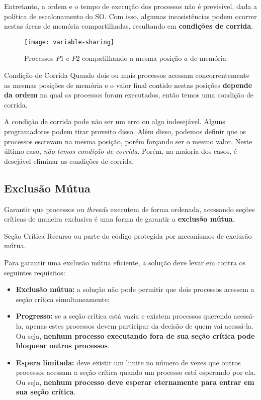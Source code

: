 Entretanto, a ordem e o tempo de execução dos processos não é previsível, dada a política de escalonamento do SO. Com isso, algumas incosistências podem ocorrer nestas áreas de memória compartilhadas, resultando em \textbf{condições de corrida}.

\begin{figure}
  \texttt{[image: variable-sharing]}
  \caption{Processos $P1$ e $P2$ compatilhando a mesma posição $a$ de memória}
  \label{fig:variable-sharing}
\end{figure}

\begin{definicao}{Condição de Corrida}
  Quando dois ou mais processos acessam concorrentemente as mesmas posições de memória e o valor final contido nestas posições \textbf{depende da ordem} na qual os processos foram executados, então temos uma condição de corrida.
\end{definicao}

A condição de corrida pode não ser um erro ou algo indesejável. Alguns programadores podem tirar proveito disso. Além disso, podemos definir que os processos escrevam na mesma posição, porém forçando ser o mesmo valor. Neste último caso, \textit{não temos condição de corrida}. Porém, na maioria dos casos, é desejável eliminar as condições de corrida.





\subsection{Exclusão Mútua}
Garantir que processos ou \textit{threads} executem de forma ordenada, acessando seções críticas de maneira exclusiva é uma forma de garantir a \textbf{exclusão mútua}.

\begin{definicao}{Seção Crítica}
  Recurso ou parte do código protegida por mecanismos de exclusão mútua.
\end{definicao}

Para garantir uma exclusão mútua eficiente, a solução deve levar em contra os seguintes requisitos:
\begin{itemize}
  \item \textbf{Exclusão mútua:} a solução não pode permitir que dois processos acessem a seção crítica simultaneamente;

  \item \textbf{Progresso:} se a seção crítica está vazia e existem processos querendo acessá-la, apenas estes processos devem participar da decisão de quem vai acessá-la. Ou seja, \textbf{nenhum processo executando fora de sua seção crítica pode bloquear outros processos}.

  \item \textbf{Espera limitada:} deve existir um limite no número de vezes que outros processos acessam a seção crítica quando um processo está esperando por ela. Ou seja, \textbf{nenhum processo deve esperar eternamente para entrar em sua seção crítica}.
\end{itemize}








